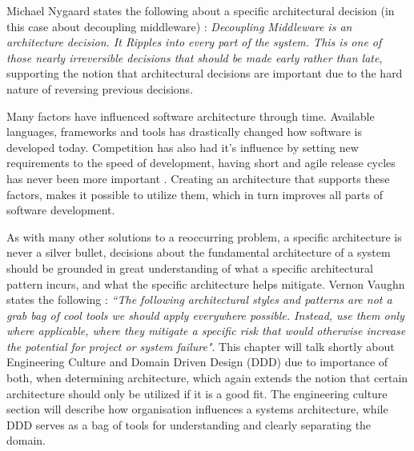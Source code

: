 Michael Nygaard states the following about a specific architectural decision (in this case about decoupling middleware) \cite[p.~116]{nygard2007release}: \textit{Decoupling Middleware is an architecture decision. It Ripples into every part of the system. This is one of those nearly irreversible decisions that should be made early rather than late}, supporting the notion that architectural decisions are important due to the hard nature of reversing previous decisions.

Many factors have influenced software architecture through time. Available languages, frameworks and tools has drastically changed how software is developed today. Competition has also had it's influence by setting new requirements to the speed of development, having short and agile release cycles has never been more important \cite[t.~6:55]{george2016it}. Creating an architecture that supports these factors, makes it possible to utilize them, which in turn improves all parts of software development.

As with many other solutions to a reoccurring problem, a specific architecture is never a silver bullet, decisions about the fundamental architecture of a system should be grounded in great understanding of what a specific architectural pattern incurs, and what the specific architecture helps mitigate. Vernon Vaughn states the following \cite[p.~113]{vernon2013implementing}: \textit{“The following architectural styles and patterns are not a grab bag of cool tools we should apply everywhere possible. Instead, use them only where applicable, where they mitigate a specific risk that would otherwise increase the potential for project or system failure"}. This chapter will talk shortly about Engineering Culture and Domain Driven Design (DDD) due to importance of both, when determining architecture, which again extends the notion that certain architecture should only be utilized if it is a good fit. The engineering culture section will describe how organisation influences a systems architecture, while DDD serves as a bag of tools for understanding and clearly separating the domain.

